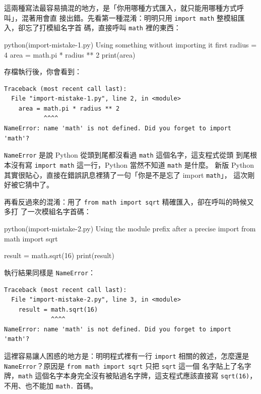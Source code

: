
這兩種寫法最容易搞混的地方，是「你用哪種方式匯入，就只能用哪種方式呼叫」，混著用會直
接出錯。先看第一種混淆：明明只用 \texttt{import math} 整模組匯入，卻忘了打模組名字首
碼，直接呼叫 \texttt{math} 裡的東西：

\begin{example}{python}{(import-mistake-1.py) Using something without importing it first}
radius = 4
area = math.pi * radius ** 2
print(area)
\end{example}

存檔執行後，你會看到：

\begin{verbatim}
Traceback (most recent call last):
  File "import-mistake-1.py", line 2, in <module>
    area = math.pi * radius ** 2
           ^^^^
NameError: name 'math' is not defined. Did you forget to import 'math'?
\end{verbatim}

\texttt{NameError} 是說 Python 從頭到尾都沒看過 \texttt{math} 這個名字，這支程式從頭
到尾根本沒有寫 \texttt{import math} 這一行，Python 當然不知道 \texttt{math} 是什麼。
新版 Python 其實很貼心，直接在錯誤訊息裡猜了一句「你是不是忘了 import \texttt{math}」，
這次剛好被它猜中了。

再看反過來的混淆：用了 \texttt{from math import sqrt} 精確匯入，卻在呼叫的時候又多打
了一次模組名字首碼：

\begin{example}{python}{(import-mistake-2.py) Using the module prefix after a precise import}
from math import sqrt

result = math.sqrt(16)
print(result)
\end{example}

執行結果同樣是 \texttt{NameError}：

\begin{verbatim}
Traceback (most recent call last):
  File "import-mistake-2.py", line 3, in <module>
    result = math.sqrt(16)
             ^^^^
NameError: name 'math' is not defined. Did you forget to import 'math'?
\end{verbatim}

這裡容易讓人困惑的地方是：明明程式裡有一行 \texttt{import} 相關的敘述，怎麼還是
\texttt{NameError}？原因是 \texttt{from math import sqrt} 只把 \texttt{sqrt} 這一個
名字貼上了名字牌，\texttt{math} 這個名字本身完全沒有被貼過名字牌，這支程式應該直接寫
\texttt{sqrt(16)}，不用、也不能加 \texttt{math.} 首碼。

